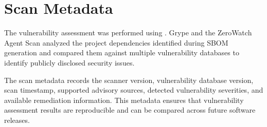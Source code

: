 \vspace{0.4cm}

\section{Scan Metadata}

The vulnerability assessment was performed using \textbf{\VulScanner}. Grype and the ZeroWatch Agent Scan analyzed the project dependencies identified during SBOM generation and compared them against multiple vulnerability databases to identify publicly disclosed security issues.

The scan metadata records the scanner version, vulnerability database version, scan timestamp, supported advisory sources, detected vulnerability severities, and available remediation information. This metadata ensures that vulnerability assessment results are reproducible and can be compared across future software releases.
